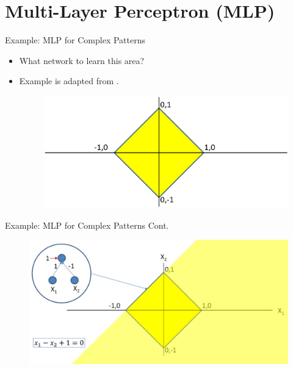 \documentclass[serif, aspectratio=169]{beamer}
\begin{document}
\section{Multi-Layer Perceptron (MLP)}

\begin{frame}{Example: MLP for Complex Patterns}
	\begin{itemize}
		\item What network to learn this area?
		\item Example is adapted from \cite{cmu_deep_learning_2023}.
		      \begin{figure}[htpb]
		      	\begin{center}
		      		\includegraphics[keepaspectratio, scale=0.25]{pic/2/ex1.png}
		      	\end{center}
		      \end{figure}
	\end{itemize}
\end{frame}


\begin{frame}{Example: MLP for Complex Patterns Cont.}
	\begin{figure}[htpb]
		\begin{center}
			\includegraphics[keepaspectratio, scale=0.25]{pic/2/ex2.png}
		\end{center}
	\end{figure}
\end{frame}
\end{document}
